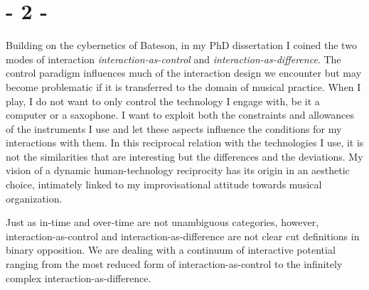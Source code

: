 \documentclass{article}
\begin{document}
\section*{- 2 -}
\label{sec:-2-}


Building on the cybernetics of Bateson, in my PhD dissertation \cite{frisk08} I coined the two modes of interaction \emph{interaction-as-control} and \emph{interaction-as-difference}. The control paradigm influences much of the interaction design we encounter %
but may become problematic if it is transferred to the domain of musical practice. When I play, I do not want to only control the technology I engage with, be it a computer or a saxophone. I want to exploit both the constraints and allowances of the instruments I use and let these aspects influence the conditions for my interactions with them. In this reciprocal relation with the technologies I use, it is not the similarities that are interesting but the differences and the deviations. My vision of a dynamic human-technology reciprocity has its origin in an aesthetic choice, intimately linked to my improvisational attitude towards musical organization. 

Just as in-time and over-time are not unambiguous categories, however, interaction-as-control and interaction-as-difference are not clear cut definitions in binary opposition. We are dealing with a continuum of interactive potential ranging from the most reduced form of interaction-as-control %
to the infinitely complex interaction-as-difference.  %

\end{document}
